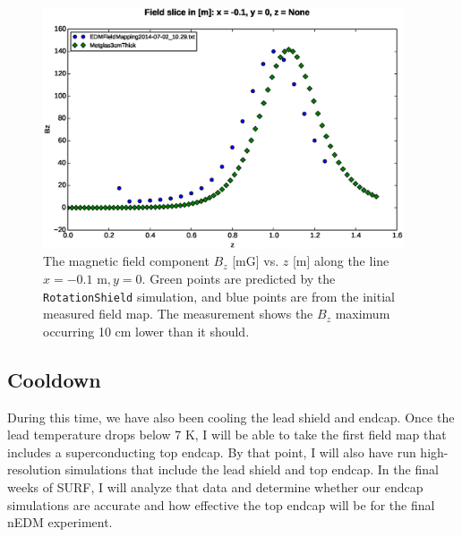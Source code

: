 \documentclass[twocolumn,aps,prb,citeautoscript]{revtex4-1}
\begin{document}
\begin{figure}
\includegraphics[width=0.95\textwidth]{../savedplots/original_Bz.eps}
\caption{\label{fig:orig_Bz_z}The magnetic field component $B_z$ [mG] vs. $z$ [m] along the line
$x = -0.1 \text{ m}, y = 0$. Green points are predicted by the \texttt{RotationShield} simulation, and blue points
are from the initial measured field map. The measurement shows the $B_z$ maximum occurring 10 cm lower than it should.}
\end{figure}

\subsection{Cooldown}

During this time, we have also been cooling the lead shield and endcap. Once the lead temperature drops below
7 K, I will be able to take the first field map that includes a superconducting top endcap. By that point, I will
also have run high-resolution simulations that include the lead shield and top endcap. In the final weeks of SURF,
I will analyze that data and determine whether our endcap simulations are accurate and how effective the top endcap
will be for the final nEDM experiment.
\end{document}
